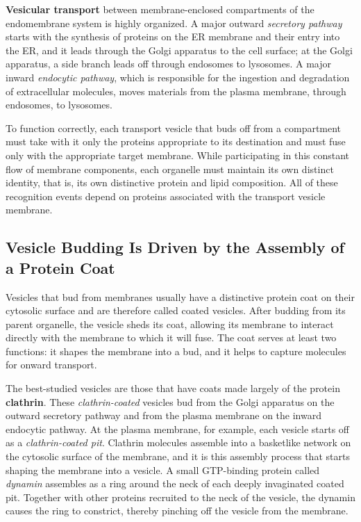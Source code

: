 \textbf{Vesicular transport} between membrane-enclosed compartments of the
endomembrane system is highly organized. A major outward \textit{secretory
pathway} starts with the synthesis of proteins on the ER membrane and
their entry into the ER, and it leads through the Golgi apparatus to the
cell surface; at the Golgi apparatus, a side branch leads off through endosomes 
to lysosomes. A major inward \textit{endocytic pathway},
which is responsible for the ingestion and degradation of extracellular
molecules, moves materials from the plasma membrane, through endosomes, to lysosomes.

To function correctly, each transport vesicle that buds off from a compartment 
must take with it only the proteins appropriate to its destination and
must fuse only with the appropriate target membrane.
While participating in this constant flow of membrane components, each
organelle must maintain its own distinct identity, that is, its own distinctive 
protein and lipid composition. All of these recognition events depend
on proteins associated with the transport vesicle membrane.

\subsection{Vesicle Budding Is Driven by the Assembly of a Protein Coat}

Vesicles that bud from membranes usually have a distinctive protein coat
on their cytosolic surface and are therefore called coated vesicles. After
budding from its parent organelle, the vesicle sheds its coat, allowing its
membrane to interact directly with the membrane to which it will fuse.
The coat serves at least two functions: it shapes the membrane
into a bud, and it helps to capture molecules for onward transport.

The best-studied vesicles are those that have coats made largely of the
protein \textbf{clathrin}. These \textit{clathrin-coated} vesicles bud from the Golgi apparatus 
on the outward secretory pathway and from the plasma membrane
on the inward endocytic pathway. At the plasma membrane, for example,
each vesicle starts off as a \textit{clathrin-coated pit}. Clathrin molecules assemble 
into a basketlike network on the cytosolic surface of the membrane,
and it is this assembly process that starts shaping the membrane into
a vesicle. A small GTP-binding protein called \textit{dynamin}
assembles as a ring around the neck of each deeply invaginated coated
pit. Together with other proteins recruited to the neck of the vesicle, the
dynamin causes the ring to constrict, thereby pinching off the vesicle
from the membrane.

